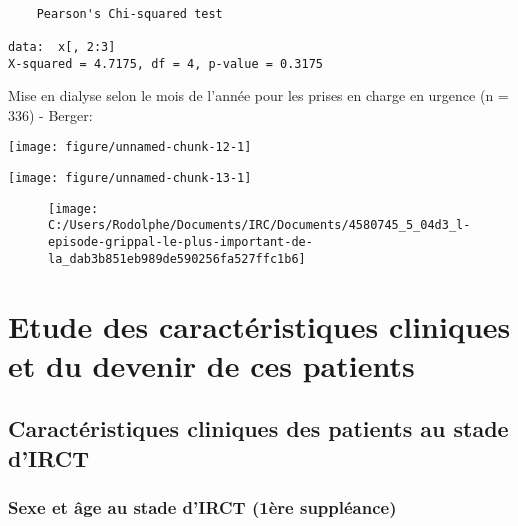 \documentclass[11pt,a4paper]{article}\usepackage[]{graphicx}\usepackage[]{color}
\makeatletter
\def\maxwidth{ %
  \ifdim\Gin@nat@width>\linewidth
    \linewidth
  \else
    \Gin@nat@width
  \fi
}
\newenvironment{kframe}{%
 \def\at@end@of@kframe{}%
 \ifinner\ifhmode%
  \def\at@end@of@kframe{\end{minipage}}%
  \begin{minipage}{\columnwidth}%
 \fi\fi%
 \def\FrameCommand##1{\hskip\@totalleftmargin \hskip-\fboxsep
 \colorbox{shadecolor}{##1}\hskip-\fboxsep
     \hskip-\linewidth \hskip-\@totalleftmargin \hskip\columnwidth}%
 \MakeFramed {\advance\hsize-\width
   \@totalleftmargin\z@ \linewidth\hsize
   \@setminipage}}%
 {\par\unskip\endMakeFramed%
 \at@end@of@kframe}
\newenvironment{knitrout}{}{} %
\makeatother
\begin{document}
\begin{knitrout}
\color{fgcolor}\begin{kframe}
\begin{verbatim}

	Pearson's Chi-squared test

data:  x[, 2:3]
X-squared = 4.7175, df = 4, p-value = 0.3175
\end{verbatim}
\end{kframe}
\end{knitrout}




Mise en dialyse selon le mois de l'année pour les prises en charge en urgence (n = 336) - Berger:

\begin{knitrout}
\color{fgcolor}
\texttt{[image: figure/unnamed-chunk-12-1]} 

\end{knitrout}

\begin{knitrout}
\color{fgcolor}
\texttt{[image: figure/unnamed-chunk-13-1]} 

\end{knitrout}

\begin{figure}[H]
	\centering
	\texttt{[image: C:/Users/Rodolphe/Documents/IRC/Documents/4580745\_5\_04d3\_l-episode-grippal-le-plus-important-de-la\_dab3b851eb989de590256fa527ffc1b6]}
\end{figure}

\section{Etude des caractéristiques cliniques et du devenir de ces patients}

  \subsection{Caractéristiques cliniques des patients au stade d’IRCT}
  
    \subsubsection{Sexe et âge au stade d’IRCT (1ère suppléance)}
\end{document}

